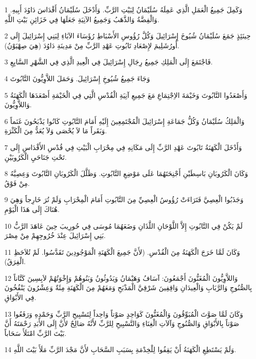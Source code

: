 \par 1 وَكَمِلَ جَمِيعُ الْعَمَلِ الَّذِي عَمِلَهُ سُلَيْمَانُ لِبَيْتِ الرَّبِّ. وَأَدْخَلَ سُلَيْمَانُ أَقْدَاسَ دَاوُدَ أَبِيهِ. وَالْفِضَّةُ وَالذَّهَبُ وَجَمِيعُ الآنِيَةِ جَعَلَهَا فِي خَزَائِنِ بَيْتِ اللَّهِ.
\par 2 حِينَئِذٍ جَمَعَ سُلَيْمَانُ شُيُوخَ إِسْرَائِيلَ وَكُلَّ رُؤُوسِ الأَسْبَاطِ رُؤَسَاءَ الآبَاءِ لِبَنِي إِسْرَائِيلَ إِلَى أُورُشَلِيمَ لإِصْعَادِ تَابُوتِ عَهْدِ الرَّبِّ مِنْ مَدِينَةِ دَاوُدَ (هِيَ صِهْيَوْنُ).
\par 3 فَاجْتَمَعَ إِلَى الْمَلِكِ جَمِيعُ رِجَالِ إِسْرَائِيلَ فِي الْعِيدِ الَّذِي فِي الشَّهْرِ السَّابِعِ.
\par 4 وَجَاءَ جَمِيعُ شُيُوخِ إِسْرَائِيلَ. وَحَمَلَ اللاَّوِيُّونَ التَّابُوتَ
\par 5 وَأَصْعَدُوا التَّابُوتَ وَخَيْمَةَ الاِجْتِمَاعِ مَعَ جَمِيعِ آنِيَةِ الْقُدْسِ الَّتِي فِي الْخَيْمَةِ أَصْعَدَهَا الْكَهَنَةُ وَاللاَّوِيُّونَ.
\par 6 وَالْمَلِكُ سُلَيْمَانُ وَكُلُّ جَمَاعَةِ إِسْرَائِيلَ الْمُجْتَمِعِينَ إِلَيْهِ أَمَامَ التَّابُوتِ كَانُوا يَذْبَحُونَ غَنَماً وَبَقَراً مَا لاَ يُحْصَى وَلاَ يُعَدُّ مِنَ الْكَثْرَةِ.
\par 7 وَأَدْخَلَ الْكَهَنَةُ تَابُوتَ عَهْدِ الرَّبِّ إِلَى مَكَانِهِ فِي مِحْرَابِ الْبَيْتِ فِي قُدْسِ الأَقْدَاسِ إِلَى تَحْتِ جَنَاحَيِ الْكَرُوبَيْنِ.
\par 8 وَكَانَ الْكَرُوبَانِ بَاسِطَيْنِ أَجْنِحَتَهُمَا عَلَى مَوْضِعِ التَّابُوتِ. وَظَلَّلَ الْكَرُوبَانِ التَّابُوتَ وَعِصِيَّهُ مِنْ فَوْقُ.
\par 9 وَجَذَبُوا الْعِصِيَّ فَتَرَاءَتْ رُؤُوسُ الْعِصِيِّ مِنَ التَّابُوتِ أَمَامَ الْمِحْرَابِ وَلَمْ تُرَ خَارِجاً وَهِيَ هُنَاكَ إِلَى هَذَا الْيَوْمِ.
\par 10 لَمْ يَكُنْ فِي التَّابُوتِ إِلاَّ اللَّوْحَانِ اللَّذَانِ وَضَعَهُمَا مُوسَى فِي حُورِيبَ حِينَ عَاهَدَ الرَّبُّ بَنِي إِسْرَائِيلَ عِنْدَ خُرُوجِهِمْ مِنْ مِصْرَ.
\par 11 وَكَانَ لَمَّا خَرَجَ الْكَهَنَةُ مِنَ الْقُدْسِ. (لأَنَّ جَمِيعَ الْكَهَنَةِ الْمَوْجُودِينَ تَقَدَّسُوا. لَمْ تُلاَحَظِ الْفِرَقُ).
\par 12 وَاللاَّوِيُّونَ الْمُغَنُّونَ أَجْمَعُونَ: آسَافُ وَهَيْمَانُ وَيَدُوثُونُ وَبَنُوهُمْ وَإِخْوَتُهُمْ لاَبِسِينَ كَتَّاناً بِالصُّنُوجِ وَالرَّبَابِ وَالْعِيدَانِ وَاقِفِينَ شَرْقِيَّ الْمَذْبَحِ وَمَعَهُمْ مِنَ الْكَهَنَةِ مِئَةٌ وَعِشْرُونَ يَنْفُخُونَ فِي الأَبْوَاقِ.
\par 13 وَكَانَ لَمَّا صَوَّتَ الْمُبَوِّقُونَ وَالْمُغَنُّونَ كَوَاحِدٍ صَوْتاً وَاحِداً لِتَسْبِيحِ الرَّبِّ وَحَمْدِهِ وَرَفَعُوا صَوْتاً بِالأَبْوَاقِ وَالصُّنُوجِ وَآلاَتِ الْغِنَاءِ وَالتَّسْبِيحِ لِلرَّبِّ لأَنَّهُ صَالِحٌ لأَنَّ إِلَى الأَبَدِ رَحْمَتَهُ أَنَّ بَيْتَ الرَّبِّ امْتَلَأَ سَحَاباً.
\par 14 وَلَمْ يَسْتَطِعِ الْكَهَنَةُ أَنْ يَقِفُوا لِلْخِدْمَةِ بِسَبَبِ السَّحَابِ لأَنَّ مَجْدَ الرَّبِّ مَلَأَ بَيْتَ اللَّهِ.

